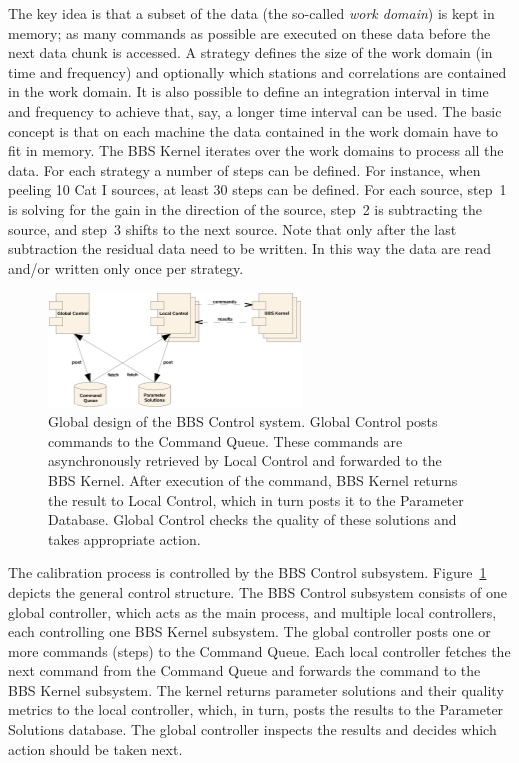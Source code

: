 \documentclass[10pt]{lofar}
\begin{document}
The key idea is that a subset of the data (the so-called \emph{work domain})
is kept in memory; as many commands as possible are executed on these data
before the next data chunk is accessed. A strategy defines the size of the
work domain (in time and frequency) and optionally which stations and
correlations are contained in the work domain. It is also possible to define
an integration interval in time and frequency to achieve that, say, a longer
time interval can be used. The basic concept is that on each machine the data
contained in the work domain have to fit in memory. The BBS Kernel iterates
over the work domains to process all the data.  For each strategy a number of
steps can be defined. For instance, when peeling 10 Cat I sources, at least 30
steps can be defined. For each source, step~1 is solving for the gain in the
direction of the source, step~2 is subtracting the source, and step~3 shifts
to the next source. Note that only after the last subtraction the residual
data need to be written.  In this way the data are read and/or written only
once per strategy.

\begin{figure}[!ht]
\centering
\includegraphics[width=0.6\textwidth]{images/bbs-control-global-design}
\caption{Global design of the BBS Control system. Global Control posts commands
to the Command Queue. These commands are asynchronously retrieved by Local
Control and forwarded to the BBS Kernel. After execution of the command, BBS
Kernel returns the result to Local Control, which in turn posts it to the
Parameter Database. Global Control checks the quality of these solutions and
takes appropriate action.}
\label{fig:bbs-control-global-design}
\end{figure}

The calibration process is controlled by the BBS Control
subsystem. Figure~\ref{fig:bbs-control-global-design} depicts the general
control structure. The BBS Control subsystem consists of one global
controller, which acts as the main process, and multiple local controllers,
each controlling one BBS Kernel subsystem. The global controller posts one or
more commands (steps) to the Command Queue. Each local controller fetches the
next command from the Command Queue and forwards the command to the BBS Kernel
subsystem. The kernel returns parameter solutions and their quality metrics to
the local controller, which, in turn, posts the results to the Parameter
Solutions database. The global controller inspects the results and decides
which action should be taken next.
\end{document}
